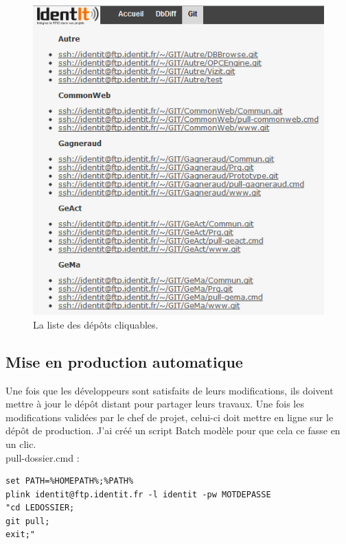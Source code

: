 \begin{figure}
\begin{center}
\includegraphics[scale=0.5]{images/repo.png}
\caption{La liste des dépôts cliquables.}
\end{center}
\end{figure}


\subsection{Mise en production automatique} %

Une fois que les développeurs sont satisfaits de leurs modifications, ils
doivent mettre à jour le dépôt distant pour partager leurs travaux. Une fois
les modifications validées par le chef de projet, celui-ci doit mettre en ligne
sur le dépôt de production. J'ai créé un script Batch \og modèle \fg{} pour
que cela ce fasse en un clic.\\

pull-dossier.cmd :
\begin{lstlisting}
set PATH=%HOMEPATH%;%PATH%
plink identit@ftp.identit.fr -l identit -pw MOTDEPASSE
"cd LEDOSSIER;
git pull;
exit;"
\end{lstlisting}

